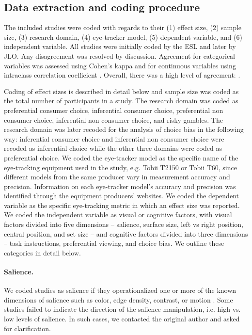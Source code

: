 \subsection{Data extraction and coding procedure}

The included studies were coded with regards to their (1) effect size, (2) sample size, (3) research domain, (4) eye-tracker model, (5) dependent variable, and (6) independent variable. All studies were initially coded by the ESL and later by JLO. Any disagreement was resolved by discussion. Agreement for categorical variables was assessed using Cohen's kappa and for continuous variables using intraclass correlation coefficient \citep{shrout1979a}. Overall, there was a high level of agreement: .

Coding of effect sizes is described in detail below and sample size was coded as the total number of participants in a study. The research domain was coded as preferential consumer choice, inferential consumer choice, preferential non consumer choice, inferential non consumer choice, and risky gambles. The research domain was later recoded for the analysis of choice bias in the following way: inferential consumer choice and inferential non consumer choice were recoded as inferential choice while the other three domains were coded as preferential choice. We coded the eye-tracker model as the specific name of the eye-tracking equipment used in the study, e.g. Tobii T2150 or Tobii T60, since different models from the same producer vary in measurement accuracy and precision. Information on each eye-tracker model's accuracy and precision was identified through the equipment producers' websites. We coded the dependent variable as the specific eye-tracking metric in which an effect size was reported. We coded the independent variable as visual or cognitive factors, with visual factors divided into five dimensions -- salience, surface size, left vs right position, central position, and set size -- and cognitive factors divided into three dimensions -- task instructions, preferential viewing, and choice bias. We outline these categories in detail below. 

\paragraph{Salience.} We coded studies as salience if they operationalized one or more of the known dimensions of salience such as color, edge density, contrast, or motion \citep{itti2000}. Some studies failed to indicate the direction of the salience manipulation, i.e. high vs. low levels of salience. In such cases, we contacted the original author and asked for clarification.

